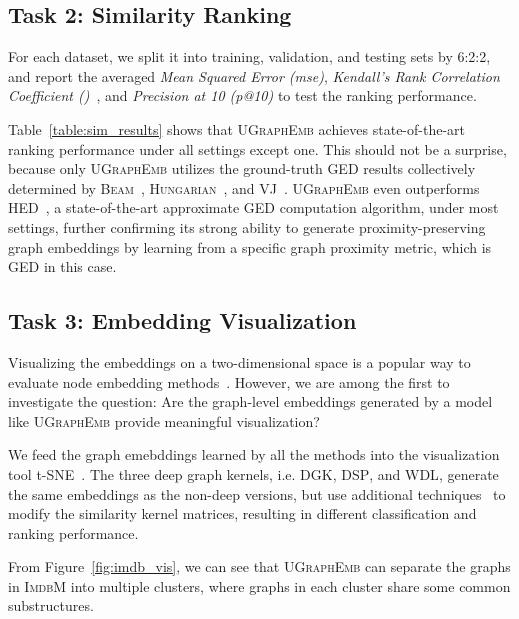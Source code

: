 \documentclass{article}
\newcommand{\model}{\textsc{UGraphEmb}\xspace}
\newcommand{\beam}{\textsc{Beam}\xspace}
\newcommand{\hungarian}{\textsc{Hungarian}\xspace}
\newcommand{\vj}{\textsc{VJ}\xspace}
\newcommand{\hed}{\textsc{HED}\xspace}
\newcommand{\imdb}{\textsc{ImdbM}\xspace}
\begin{document}
\subsection{Task 2: Similarity Ranking}


For each dataset, we split it into training, validation, and testing sets by 6:2:2, and report the averaged \textit{Mean Squared Error (mse)}, \textit{Kendall's Rank Correlation Coefficient ()}~\cite{kendall1938new}, and \textit{Precision at 10 (p@10)} to test the ranking performance. 


Table~\ref{table:sim_results} shows that \model achieves state-of-the-art ranking performance under all settings except one. This should not be a surprise, because only \model utilizes the ground-truth GED results collectively determined by \beam~\cite{neuhaus2006fast}, \hungarian~\cite{riesen2009approximate}, and \vj~\cite{fankhauser2011speeding}. \model even outperforms \hed~\cite{fischer2015approximation}, a state-of-the-art approximate GED computation algorithm, under most settings, further confirming its strong ability to generate proximity-preserving graph embeddings by learning from a specific graph proximity metric, which is GED in this case.




\subsection{Task 3: Embedding Visualization}

Visualizing the embeddings on a two-dimensional space is a popular way to evaluate node embedding methods~\cite{tang2015line}. However, we are among the first to investigate the question: Are the graph-level embeddings generated by a model like \model provide meaningful visualization?

We feed the graph emebddings learned by all the methods into the visualization tool t-SNE~\cite{maaten2008visualizing}. The three deep graph kernels, i.e. \textsc{DGK}, \textsc{DSP}, and \textsc{WDL}, generate the same embeddings as the non-deep versions, but use additional techniques~\cite{yanardag2015deep} to modify the similarity kernel matrices, resulting in different classification and ranking performance.

From Figure~\ref{fig:imdb_vis}, we can see that
\model can separate the graphs in \imdb into multiple clusters, where graphs in each cluster share some common substructures. 
\end{document}
